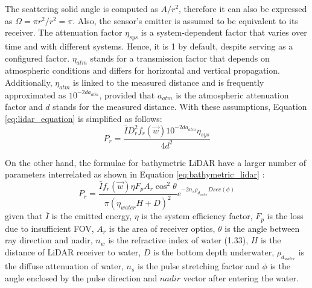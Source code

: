 The scattering solid angle is computed as $A / r^{2}$, therefore it can also be expressed as $\Omega = \pi r^{2} / r^{2} = \pi$. Also, the sensor's emitter is assumed to be equivalent to its receiver. The attenuation factor $\eta_{sys}$ is a system-dependent factor that varies over time and with different systems. Hence, it is 1 by default, despite serving as a configured factor. $\eta_{atm}$ stands for a transmission factor that depends on atmospheric conditions \cite{hofle_correction_2007} and differs for horizontal and vertical propagation. Additionally, $\eta_{atm}$ is linked to the measured distance and is frequently approximated as $10^{-2da_{atm}}$, provided that $a_{atm}$ is the atmospheric attenuation factor and $d$ stands for the measured distance. With these assumptions, Equation \ref{eq:lidar_equation} is simplified as follows:
\begin{equation}
    \label{eq:lidar_equation_simplified}
    P_{r} = \frac{\bar{I} D^{2}_{r} f_{r}(\vec{w}) 10^{-2da_{atm}} \eta_{sys}}{4 d^{2}}
\end{equation}

On the other hand, the formulae for bathymetric LiDAR have a larger number of parameters interrelated as shown in Equation \ref{eq:bathymetric_lidar} \cite{narayanan_classification_2009}:
\begin{equation}
    \label{eq:bathymetric_lidar}
    P_{r} = \frac{\bar{I} f_{r}(\vec{w}) \eta F_{p} A_{r} \cos^{2}{\theta}}{\pi(\eta_{\textit{water}} H + D)^{2}} e^{-2 n_{s} \rho_{d_{\textit{water}}} D sec(\phi)}
\end{equation}
given that $\bar{I}$ is the emitted energy, $\eta$ is the system efficiency factor, $F_{p}$ is the loss due to insufficient FOV, $A_{r}$ is the area of receiver optics, $\theta$ is the angle between ray direction and nadir, $n_{w}$ is the refractive index of water (1.33), $H$ is the distance of LiDAR receiver to water, $D$ is the bottom depth underwater, $\rho_{d_{\textit{water}}}$ is the diffuse attenuation of water, $n_{s}$ is the pulse stretching factor and $\phi$ is the angle enclosed by the pulse direction and $\textit{nadir}$ vector after entering the water.

